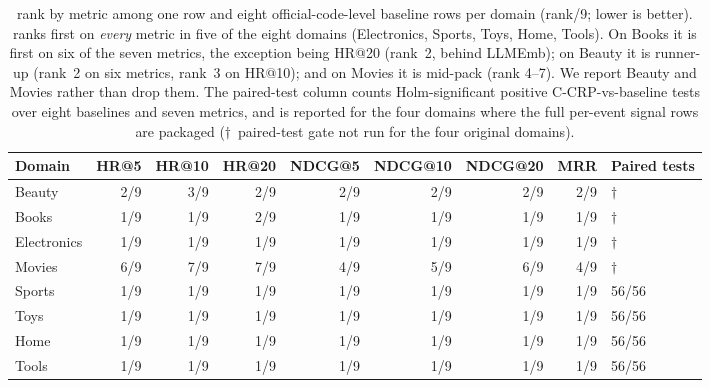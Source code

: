 \begin{table}[t]
\centering
\scriptsize
\setlength{\tabcolsep}{4pt}
\caption{\method{} rank by metric among one \method{} row and eight
official-code-level baseline rows per domain (rank/9; lower is better).
\method{} ranks first on \emph{every} metric in five of the eight domains
(Electronics, Sports, Toys, Home, Tools). On Books it is first on six of the
seven metrics, the exception being HR@20 (rank~2, behind LLMEmb); on Beauty it
is runner-up (rank~2 on six metrics, rank~3 on HR@10); and on Movies it is
mid-pack (rank 4--7). We report Beauty and Movies rather than drop them.
The paired-test column counts Holm-significant positive C-CRP-vs-baseline tests
over eight baselines and seven metrics, and is reported for the four domains
where the full per-event signal rows are packaged ($\dagger$~paired-test gate
not run for the four original domains).}
\label{tab:ccrp_rank_by_metric}
\begin{tabular}{lrrrrrrrl}
\toprule
Domain & HR@5 & HR@10 & HR@20 & NDCG@5 & NDCG@10 & NDCG@20 & MRR & Paired tests \\
\midrule
Beauty & 2/9 & 3/9 & 2/9 & 2/9 & 2/9 & 2/9 & 2/9 & $\dagger$ \\
Books & 1/9 & 1/9 & 2/9 & 1/9 & 1/9 & 1/9 & 1/9 & $\dagger$ \\
Electronics & 1/9 & 1/9 & 1/9 & 1/9 & 1/9 & 1/9 & 1/9 & $\dagger$ \\
Movies & 6/9 & 7/9 & 7/9 & 4/9 & 5/9 & 6/9 & 4/9 & $\dagger$ \\
Sports & 1/9 & 1/9 & 1/9 & 1/9 & 1/9 & 1/9 & 1/9 & 56/56 \\
Toys & 1/9 & 1/9 & 1/9 & 1/9 & 1/9 & 1/9 & 1/9 & 56/56 \\
Home & 1/9 & 1/9 & 1/9 & 1/9 & 1/9 & 1/9 & 1/9 & 56/56 \\
Tools & 1/9 & 1/9 & 1/9 & 1/9 & 1/9 & 1/9 & 1/9 & 56/56 \\
\bottomrule
\end{tabular}
\end{table}
